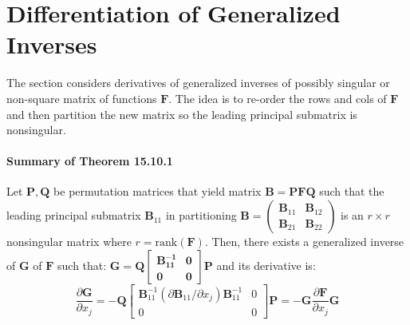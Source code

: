 \documentclass[a4paper]{article}
\newcommand{\rank}{\text{rank}}
\newcommand{\mb}{\mathbf}
\begin{document}
\section*{Differentiation of Generalized Inverses}
The section considers derivatives of generalized inverses of possibly singular or non-square matrix of functions $\mb{F}$. The idea is to re-order the rows and cols of $\mb{F}$ and then partition the new matrix so the leading principal submatrix is nonsingular. 

\paragraph{Summary of Theorem 15.10.1}

Let $\mb{P,Q}$ be permutation matrices that yield matrix $\mb{B}=\mb{PFQ}$ such that the leading principal submatrix $\mb{B}_{11}$ in partitioning $\mb{B}=\left(\begin{matrix}
\mb{B}_{11} & \mb{B}_{12} \\ \mb{B}_{21} & \mb{B}_{22}
\end{matrix}\right)$ is an $r\times r$ nonsingular matrix where $r=\rank(\mb{F})$. Then, there exists a generalized inverse of $\mb{G}$ of $\mb{F}$ such that: $\mb{G} = \mb{Q\begin{bmatrix}
\mb{B}^{-1}_{11} & 0 \\ 0 & 0
\end{bmatrix}P}$ and its derivative is:
\begin{equation}
\frac{\partial \mb{G}}{\partial x_j} = -\mb{Q} \begin{bmatrix}
\mb{B}^{-1}_{11}(\partial \mb{B}_{11}/\partial x_j)\mb{B}^{-1}_{11} & 0 \\ 0 & 0
\end{bmatrix}\mb{P} = -\mb{G}\frac{\partial \mb{F}}{\partial x_j}\mb{G}
\end{equation}

\clearpage
\newpage



\end{document}

